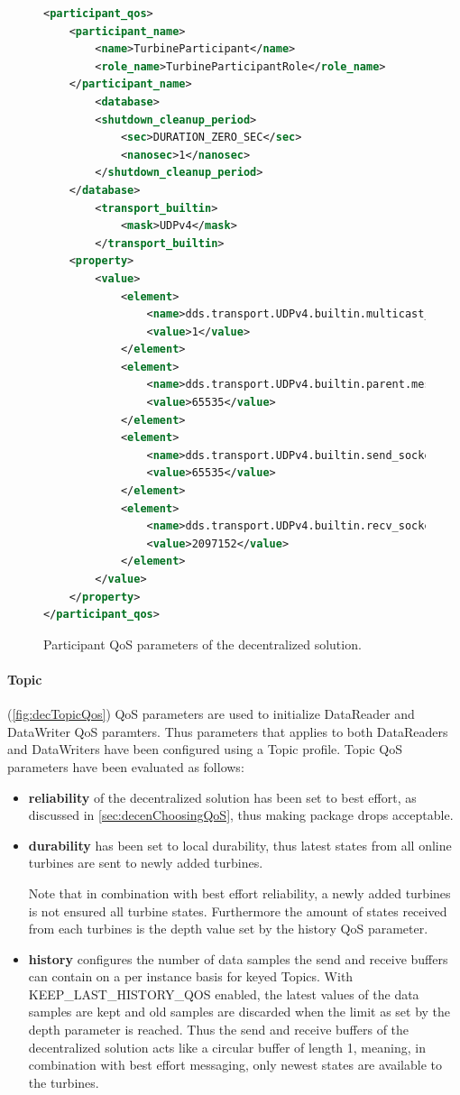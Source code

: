 \begin{figure}[!h]
\begin{lstlisting}[language=XML]
<participant_qos>
	<participant_name>
		<name>TurbineParticipant</name>
		<role_name>TurbineParticipantRole</role_name>
	</participant_name>
		<database>
		<shutdown_cleanup_period>
			<sec>DURATION_ZERO_SEC</sec>
			<nanosec>1</nanosec>
		</shutdown_cleanup_period>
	</database>
		<transport_builtin>
			<mask>UDPv4</mask>
		</transport_builtin>
	<property>
		<value>
			<element>
				<name>dds.transport.UDPv4.builtin.multicast_enabled</name>
				<value>1</value>
			</element>
			<element>
				<name>dds.transport.UDPv4.builtin.parent.message_size_max</name>
				<value>65535</value>
			</element>
			<element>
				<name>dds.transport.UDPv4.builtin.send_socket_buffer_size </name>
				<value>65535</value>
			</element>
			<element>
				<name>dds.transport.UDPv4.builtin.recv_socket_buffer_size</name>
				<value>2097152</value>
			</element>
		</value>
	</property>
</participant_qos>
\end{lstlisting}
\caption[Decentralized participant QoS parameters]{
		\label{fig:decParQos} 
		\footnotesize{Participant QoS parameters of the decentralized solution.}
	}
\end{figure}

\paragraph{Topic} (\cref{fig:decTopicQos}) QoS parameters are used to initialize DataReader and DataWriter QoS paramters. Thus parameters that applies to both DataReaders and DataWriters have been configured using a Topic profile. Topic QoS parameters have been evaluated as follows:

\begin{itemize}
	\item \textbf{reliability} of the decentralized solution has been set to best effort, as discussed in \cref{sec:decenChoosingQoS}, thus making package drops acceptable.
	\item \textbf{durability} has been set to local durability, thus latest states from all online turbines are sent to newly added turbines.
	
	Note that in combination with best effort reliability, a newly added turbines is not ensured all turbine states. Furthermore the amount of states received from each turbines is the depth value set by the history QoS parameter.
	\item \textbf{history} configures the number of data samples the send and receive buffers can contain on a per instance basis for keyed Topics. With KEEP\_LAST\_HISTORY\_QOS enabled, the latest values of the data samples are kept and old samples are discarded when the limit as set by the depth parameter is reached. Thus the send and receive buffers of the decentralized solution acts like a circular buffer of length 1, meaning, in combination with best effort messaging, only newest states are available to the turbines.
\end{itemize}

